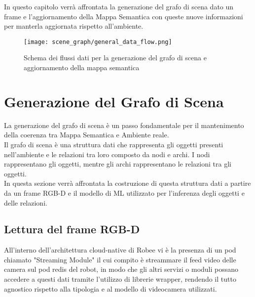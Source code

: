 In questo capitolo verrà affrontata la generazione del grafo di scena dato un frame e l'aggiornamento della Mappa Semantica con queste nuove informazioni per manterla aggiornata rispetto all'ambiente.
\begin{figure}[h]
	\texttt{[image: scene\_graph/general\_data\_flow.png]}
	\caption{Schema dei flussi dati per la generazione del grafo di scena e aggiornamento della mappa semantica }
\end{figure}

\section{Generazione del Grafo di Scena}
La generazione del grafo di scena è un passo fondamentale per il mantenimento della coerenza tra Mappa Semantica e Ambiente reale.\\
Il grafo di scena è una struttura dati che rappresenta gli oggetti presenti nell'ambiente e le relazioni tra loro composto da nodi e archi. I nodi rappresentano gli oggetti, mentre gli archi rappresentano le relazioni tra gli oggetti. \\
In questa sezione verrà affrontata la costruzione di questa struttura dati a partire da un frame RGB-D e il modello di ML utilizzato per l'inferenza degli oggetti e delle relazioni.
\subsection{Lettura del frame RGB-D}
All'interno dell'architettura cloud-native di Robee vi è la presenza di un pod chiamato "Streaming Module" il cui compito è streammare il feed video delle camera sul pod redis del robot, in modo che gli altri servizi o moduli possano accedere a questi dati tramite l'utilizzo di librerie wrapper, rendendo il tutto agnostico rispetto alla tipologia e al modello di videocamera utilizzati.

